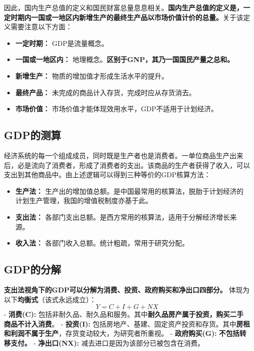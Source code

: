 \documentclass[
  11pt,
  letterpaper,
]{ctexbook}
\providecommand{\tightlist}{%
  \setlength{\itemsep}{0pt}\setlength{\parskip}{0pt}}\usepackage{longtable,booktabs,array}
\begin{document}
因此，国内生产总值的定义和国民财富总量息息相关。\textbf{国内生产总值的定义是，一定时期内一国或一地区内新增生产的最终生产品以市场价值计价的总量。}关于该定义需要注意以下方面：

\begin{itemize}
\tightlist
\item
  \textbf{一定时期：} GDP是流量概念。
\item
  \textbf{一国或一地区内：}
  地理概念。\textbf{区别于GNP，其乃一国国民产量之总和。}
\item
  \textbf{新增生产：} 物质的增加值才形成生活水平的提升。
\item
  \textbf{最终产品：} 未完成的商品计入存货，完成时应从存货消去。
\item
  \textbf{市场价值：} 市场价值才能体现效用水平，GDP不适用于计划经济。
\end{itemize}

\subsection{GDP的测算}\label{gdpux7684ux6d4bux7b97}

经济系统的每一个组成成员，同时既是生产者也是消费者。一单位商品生产出来后，必是流向了消费者，形成了消费者的支出。该商品的生产者获得了收入，可以支出到其他商品中。由上述逻辑可以得到三种等价的GDP核算方法：

\begin{itemize}
\tightlist
\item
  \textbf{生产法：}
  生产出的增加值总额。是中国最常用的核算法，脱胎于计划经济的计划生产管理，我国的增值税制度亦基于此。
\item
  \textbf{支出法：}
  各部门支出总额。是西方常用的核算法，适用于分解经济增长来源。
\item
  \textbf{收入法：} 各部门收入总额。统计粗疏，常用于研究分配。
\end{itemize}

\subsection{GDP的分解}\label{gdpux7684ux5206ux89e3}

\textbf{支出法视角下的GDP可以分解为消费、投资、政府购买和净出口四部分。}
体现为以下\textbf{均衡式}（该式永远成立）： \[
Y = C + I + G + NX
\] - \textbf{消费(C):}
包括非耐久品、耐久品和服务。其中\textbf{耐久品房产属于投资，购买二手商品不计入消费}。
- \textbf{投资(I):}
包括房地产、基建、固定资产投资和存货。其中\textbf{房租和利润不属于生产}，存货变动较大，为研究者所重视。
- \textbf{政府购买(G):} \textbf{不包括转移支付。} - \textbf{净出口(NX):}
减去进口是因为该部分已被包含在消费。
\end{document}
